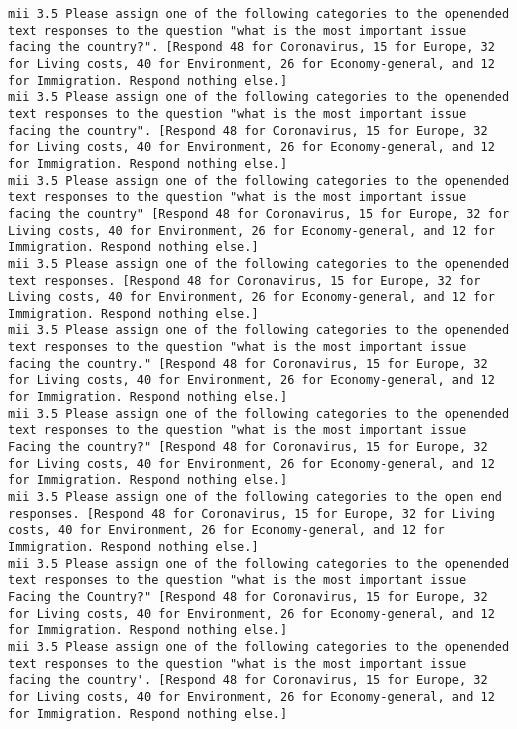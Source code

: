\begin{lstlisting}[label=lst:promptvariants]
mii	3.5	Please assign one of the following categories to the openended text responses to the question "what is the most important issue facing the country?". [Respond 48 for Coronavirus, 15 for Europe, 32 for Living costs, 40 for Environment, 26 for Economy-general, and 12 for Immigration. Respond nothing else.]
mii	3.5	Please assign one of the following categories to the openended text responses to the question "what is the most important issue facing the country". [Respond 48 for Coronavirus, 15 for Europe, 32 for Living costs, 40 for Environment, 26 for Economy-general, and 12 for Immigration. Respond nothing else.]
mii	3.5	Please assign one of the following categories to the openended text responses to the question "what is the most important issue facing the country" [Respond 48 for Coronavirus, 15 for Europe, 32 for Living costs, 40 for Environment, 26 for Economy-general, and 12 for Immigration. Respond nothing else.]
mii	3.5	Please assign one of the following categories to the openended text responses. [Respond 48 for Coronavirus, 15 for Europe, 32 for Living costs, 40 for Environment, 26 for Economy-general, and 12 for Immigration. Respond nothing else.]
mii	3.5	Please assign one of the following categories to the openended text responses to the question "what is the most important issue facing the country." [Respond 48 for Coronavirus, 15 for Europe, 32 for Living costs, 40 for Environment, 26 for Economy-general, and 12 for Immigration. Respond nothing else.]
mii	3.5	Please assign one of the following categories to the openended text responses to the question "what is the most important issue Facing the country?" [Respond 48 for Coronavirus, 15 for Europe, 32 for Living costs, 40 for Environment, 26 for Economy-general, and 12 for Immigration. Respond nothing else.]
mii	3.5	Please assign one of the following categories to the open end responses. [Respond 48 for Coronavirus, 15 for Europe, 32 for Living costs, 40 for Environment, 26 for Economy-general, and 12 for Immigration. Respond nothing else.]
mii	3.5	Please assign one of the following categories to the openended text responses to the question "what is the most important issue Facing the Country?" [Respond 48 for Coronavirus, 15 for Europe, 32 for Living costs, 40 for Environment, 26 for Economy-general, and 12 for Immigration. Respond nothing else.]
mii	3.5	Please assign one of the following categories to the openended text responses to the question "what is the most important issue facing the country'. [Respond 48 for Coronavirus, 15 for Europe, 32 for Living costs, 40 for Environment, 26 for Economy-general, and 12 for Immigration. Respond nothing else.]

\end{lstlisting}
